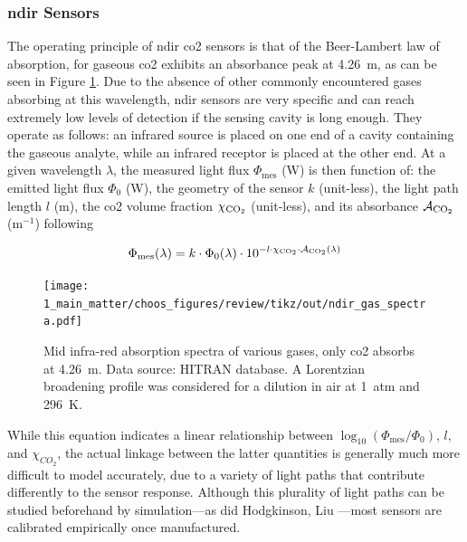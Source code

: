 \subsubsection{\texorpdfstring{\gls{ndir}}{NDIR} Sensors}\label{subsect:choos:review:ndir}

The operating principle of \gls{ndir} \gls{co2} sensors is that of the Beer-Lambert law of absorption, for gaseous \gls{co2} exhibits an absorbance peak at 4.26~\textmu{}m, as can be seen in Figure \ref{fig:choos:review:ndir_gas_spectra}. Due to the absence of other commonly encountered gases absorbing at this wavelength, \gls{ndir} sensors are very specific and can reach extremely low levels of detection if the sensing cavity is long enough. They operate as follows: an infrared source is placed on one end of a cavity containing the gaseous analyte, while an infrared receptor is placed at the other end. At a given wavelength $\lambda$, the measured light flux $\Phi_\text{mes}$ (W) is then function of: the emitted light flux $\Phi_0$ (W), the geometry of the sensor $k$ (unit-less), the light path length $l$ (m), the \gls{co2} volume fraction $\chi_{\ce{CO_2}}$ (unit-less), and its absorbance $\mathcal{A}_{\ce{CO_2}}$ (m$^{-1}$) following\cite{bernath1995}

\begin{equation}
	\Phi_\text{mes}(\lambda) = k \cdot \Phi_0(\lambda) \cdot 10^{- l \cdot \chi_{\ce{CO2}} \cdot \mathcal{A}_{\ce{CO_2}}(\lambda)}
\end{equation}

\begin{figure}
	\centering
	\texttt{[image: 1\_main\_matter/choos\_figures/review/tikz/out/ndir\_gas\_spectra.pdf]}
	\caption[Mid infra-red absorption spectra of various gases.]{Mid infra-red absorption spectra of various gases, only \gls{co2} absorbs at 4.26~\textmu{}m. Data source: HITRAN database\cite{hitran2017}. A Lorentzian broadening profile was considered for a dilution in air at 1~atm and 296~K.}
	\label{fig:choos:review:ndir_gas_spectra}
\end{figure}

While this equation indicates a linear relationship between $\log_{10}(\Phi_\mathrm{mes}/\Phi_{0})$, $l$, and $\chi_{CO_2}$, the actual linkage between the latter quantities is generally much more difficult to model accurately, due to a variety of light paths that contribute differently to the sensor response. Although this plurality of light paths can be studied beforehand by simulation---as did Hodgkinson, Liu \etal{}\cite{hodgkinson2012, hodgkinson2013, liu2016}---most sensors are calibrated empirically once manufactured.

